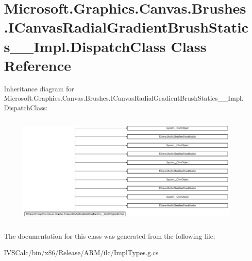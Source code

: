 \hypertarget{class_microsoft_1_1_graphics_1_1_canvas_1_1_brushes_1_1_i_canvas_radial_gradient_brush_statics_____impl_1_1_dispatch_class}{}\section{Microsoft.\+Graphics.\+Canvas.\+Brushes.\+I\+Canvas\+Radial\+Gradient\+Brush\+Statics\+\_\+\+\_\+\+Impl.\+Dispatch\+Class Class Reference}
\label{class_microsoft_1_1_graphics_1_1_canvas_1_1_brushes_1_1_i_canvas_radial_gradient_brush_statics_____impl_1_1_dispatch_class}
Inheritance diagram for Microsoft.\+Graphics.\+Canvas.\+Brushes.\+I\+Canvas\+Radial\+Gradient\+Brush\+Statics\+\_\+\+\_\+\+Impl.\+Dispatch\+Class\+:\begin{figure}[H]
\begin{center}
\leavevmode
\includegraphics[height=5.620438cm]{class_microsoft_1_1_graphics_1_1_canvas_1_1_brushes_1_1_i_canvas_radial_gradient_brush_statics_____impl_1_1_dispatch_class}
\end{center}
\end{figure}


The documentation for this class was generated from the following file\+:\begin{DoxyCompactItemize}
\item 
I\+V\+S\+Calc/bin/x86/\+Release/\+A\+R\+M/ilc/Impl\+Types.\+g.\+cs\end{DoxyCompactItemize}
